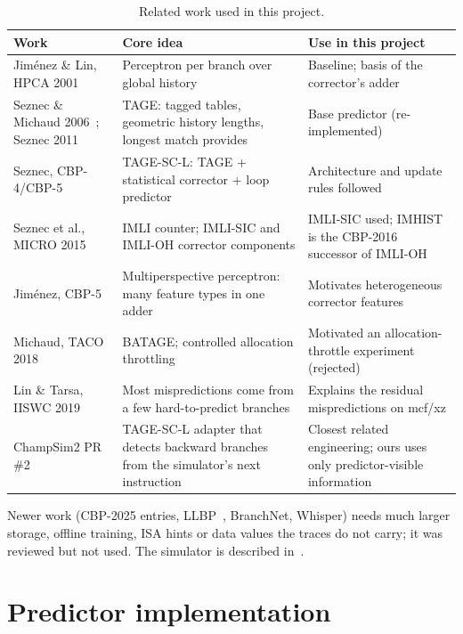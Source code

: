 \documentclass[11pt,a4paper]{article}
\renewcommand{\_}{\textunderscore\allowbreak}
\begin{document}
\begin{table}[H]
\centering\small
\caption{Related work used in this project.}
\begin{tabular}{p{3.9cm}p{5.4cm}p{5.2cm}}
\toprule
Work & Core idea & Use in this project \\
\midrule
Jim\'enez \& Lin, HPCA 2001~\cite{jimenez2001perceptron} & Perceptron per branch over global history & Baseline; basis of the corrector's adder \\
Seznec \& Michaud 2006~\cite{seznec2006tage}; Seznec 2011~\cite{seznec2011newcase} & TAGE: tagged tables, geometric history lengths, longest match provides & Base predictor (re-implemented) \\
Seznec, CBP-4/CBP-5~\cite{seznec2014tagescl,seznec2016tagescl} & TAGE-SC-L: TAGE + statistical corrector + loop predictor & Architecture and update rules followed \\
Seznec et al., MICRO 2015~\cite{seznec2015imli} & IMLI counter; IMLI-SIC and IMLI-OH corrector components & IMLI-SIC used; IMHIST is the CBP-2016 successor of IMLI-OH \\
Jim\'enez, CBP-5~\cite{jimenez2016mpp} & Multiperspective perceptron: many feature types in one adder & Motivates heterogeneous corrector features \\
Michaud, TACO 2018~\cite{michaud2018batage} & BATAGE; controlled allocation throttling & Motivated an allocation-throttle experiment (rejected) \\
Lin \& Tarsa, IISWC 2019~\cite{lin2019notsolved} & Most mispredictions come from a few hard-to-predict branches & Explains the residual mispredictions on mcf/xz \\
ChampSim2 PR \#2~\cite{champsim2pr} & TAGE-SC-L adapter that detects backward branches from the simulator's next instruction & Closest related engineering; ours uses only predictor-visible information \\
\bottomrule
\end{tabular}
\end{table}

Newer work (CBP-2025 entries, LLBP~\cite{schall2024llbp}, BranchNet, Whisper) needs much larger storage, offline training, ISA hints or data values the traces do not carry; it was reviewed but not used. The simulator is described in~\cite{gober2022champsim}.

\section{Predictor implementation}\label{sec:impl}
\end{document}
